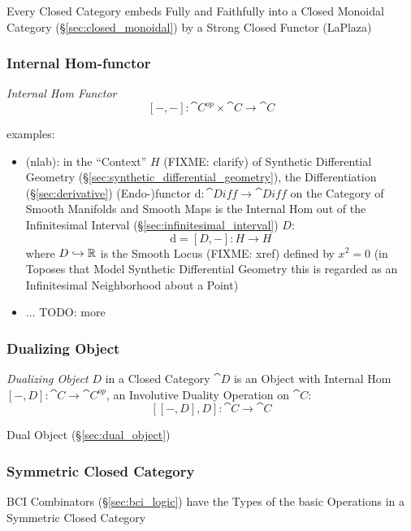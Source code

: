 Every Closed Category embeds Fully and Faithfully into a Closed
Monoidal Category (\S\ref{sec:closed_monoidal}) by a Strong Closed
Functor (LaPlaza) %



\subsubsection{Internal Hom-functor}\label{sec:internal_hom}

\emph{Internal Hom Functor}
\[
  [-,-] : \cat{C}^{op} \times \cat{C} \rightarrow \cat{C}
\]

examples:
\begin{itemize}
  \item (nlab): in the ``Context'' $H$ (FIXME: clarify) of Synthetic
    Differential Geometry (\S\ref{sec:synthetic_differential_geometry}), the
    Differentiation (\S\ref{sec:derivative}) (Endo-)functor $\mathrm{d} :
    \cat{Diff} \rightarrow \cat{Diff}$ on the Category of Smooth Manifolds and
    Smooth Maps is the Internal Hom out of the Infinitesimal Interval
    (\S\ref{sec:infinitesimal_interval}) $D$:
    \[
      \mathrm{d} = [D,-] : H \rightarrow H
    \]
    where $D \hookrightarrow \mathbb{R}$ is the Smooth Locus (FIXME: xref) defined
    by $x^2 = 0$ (in Toposes that Model Synthetic Differential Geometry this is
    regarded as an Infinitesimal Neighborhood about a Point)
  \item ... TODO: more
\end{itemize}



\subsubsection{Dualizing Object}\label{sec:dualizing_object}

\emph{Dualizing Object} $D$ in a Closed Category $\cat{D}$ is an
Object with Internal Hom $[-,D]: \cat{C} \rightarrow \cat{C}^{op}$, an
Involutive Duality Operation on $\cat{C}$: %
\[
  [[-,D],D]: \cat{C} \rightarrow \cat{C}
\]

Dual Object (\S\ref{sec:dual_object})



\subsubsection{Symmetric Closed Category}
\label{sec:symmetric_closed_category}

BCI Combinators (\S\ref{sec:bci_logic}) have the Types of the basic
Operations in a Symmetric Closed Category



